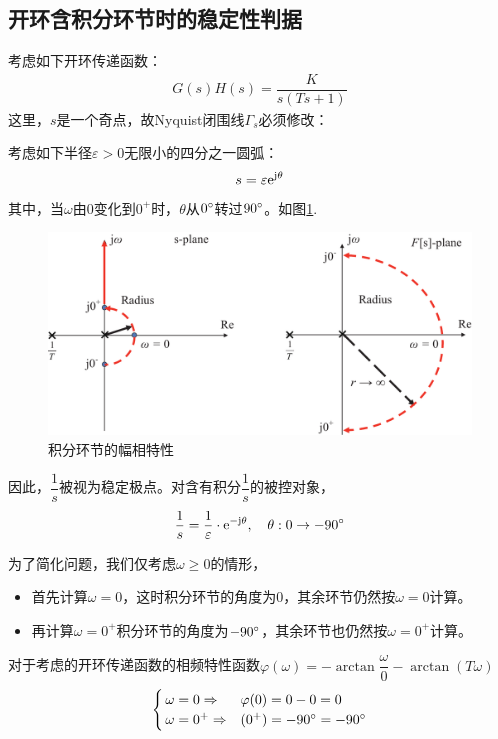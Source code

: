 \subsection{开环含积分环节时的稳定性判据}
考虑如下开环传递函数：
\begin{align}
	G(s)H(s) = \dfrac{K}{s(Ts + 1)}
\end{align}
这里，$s$是一个奇点，故Nyquist闭围线$\varGamma_s$必须修改：

考虑如下半径$\varepsilon > 0$无限小的四分之一圆弧：
\begin{align}
	s = \varepsilon {\rm{e}}^{\text{j} \theta}
\end{align}
其中，当$\omega$由0变化到$0^+$时，$\theta$从$0{}^{\circ}$转过$90{}^{\circ}$。如图\ref{积分环节的幅相特性}.
\begin{figure}[!htb]
	\centering
	\includegraphics[width=0.7\linewidth]{pic/积分环节幅相特性.pdf}
	\caption{积分环节的幅相特性}
	\label{积分环节的幅相特性}
\end{figure}

因此，$\dfrac{1}{s}$被视为稳定极点。对含有积分$\dfrac{1}{s}$的被控对象，
\begin{align}
	\dfrac{1}{s} = \dfrac{1}{\varepsilon} \cdot {\rm{e}}^{- \text{j} \theta}, \quad \theta : 0 \to -90{}^{\circ}
\end{align}

\noindent 为了简化问题，我们仅考虑$\omega \ge 0$的情形，
\begin{itemize}
	\item 首先计算$\omega = 0$，这时积分环节的角度为0，其余环节仍然按$\omega = 0$计算。\vspace*{-0.5em}
	\item 再计算$\omega = 0^+$积分环节的角度为$-90{}^{\circ}$，其余环节也仍然按$\omega = 0^+$计算。
\end{itemize}
对于考虑的开环传递函数的相频特性函数$\varphi(\omega) = -\arctan\dfrac{\omega}{0} - \arctan(T\omega)$
\begin{align*}
	\begin{cases}
		\, \omega = 0 \Rightarrow & \varphi(0) = 0 - 0 = 0\\
		\, \omega = 0^+ \Rightarrow & (0^+) = -90{}^{\circ} = -90{}^{\circ}
	\end{cases}
\end{align*}


